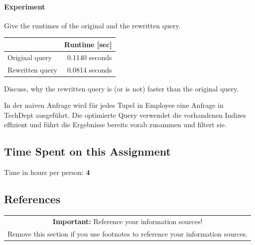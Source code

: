 \documentclass[11pt]{scrartcl}
\begin{document}
\paragraph{Experiment}

Give the runtimes of the original and the rewritten query.

\begin{table}[H]
  \centering
  \begin{tabular}{l|r}
    & Runtime [sec] \tabularnewline
    \hline
    Original query  & 0.1140 seconds \tabularnewline
    Rewritten query & 0.0814 seconds \tabularnewline
  \end{tabular}
\end{table}

Discuss, why the rewritten query is (or is not) faster than the original query.

In der naiven Anfrage wird für jedes Tupel in Employee eine Anfrage in TechDept ausgeführt. Die optimierte Query verwendet die vorhandenen Indizes effizient und führt die Ergebnisse bereits vorab zusammen und filtert sie.

\subsection*{Time Spent on this Assignment}

Time in hours per person: \textbf{4}

\subsection*{References}

\begin{table}[H]
  \centering
  \begin{tabular}{c}
    \hline
    \textbf{Important:} Reference your information sources! \tabularnewline
    Remove this section if you use footnotes to reference your information sources. \tabularnewline
    \hline
  \end{tabular}
\end{table}
\end{document}
